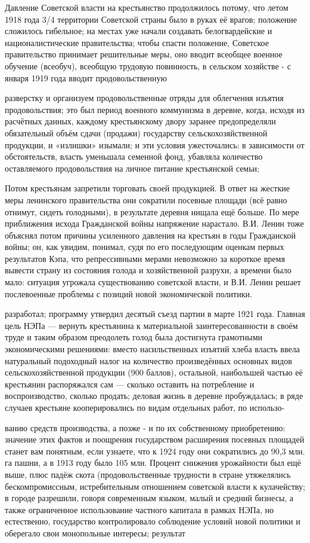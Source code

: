 Давление Советской власти на крестьянство продолжилось потому, что летом 1918 года 3/4 территории Советской страны было в руках её врагов; положение сложилось гибельное; на местах уже начали создавать белогвардейские и националистические правительства; чтобы спасти положение, Советское правительство принимает решительные меры, оно вводит всеобщее военное обучение (всеобуч), всеобщую трудовую повинность, в сельском хозяйстве - с января 1919 года вводит продовольственную

разверстку и организуем продовольственные отряды для облегчения изъятия продовольствия; это был период военного коммунизма в деревне, когда, исходя из расчётных данных, каждому крестьянскому двору заранее предопределяли обязательный объём сдачи (продажи) государству сельскохозяйственной продукции, и «излишки» изымали; и эти условия ужесточались: в зависимости от обстоятельств, власть уменьшала семенной фонд, убавляла количество оставляемого продовольствия на личное питание крестьянской семьи;

Потом крестьянам запретили торговать своей продукцией. В ответ на жесткие меры ленинского правительства они сократили посевные площади (всё равно отнимут, сидеть голодными), в результате деревня нищала ещё больше. По мере приближения исхода Гражданской войны напряжение нарастало. В.И. Ленин тоже объяснял потом причины усиленного давления на крестьян в годы Гражданской войны; он, как увидим, понимал, судя по его последующим оценкам первых результатов Кэпа, что репрессивными мерами невозможно за короткое время вывести страну из состояния голода и хозяйственной разрухи, а времени было мало: ситуация угрожала существованию советской власти, и В.И. Ленин решает послевоенные проблемы с позиций новой экономической политики.

разработал; программу утвердил десятый съезд партии в марте 1921 года. Главная цель НЭПа — вернуть крестьянина к материальной заинтересованности в своём труде и таким образом преодолеть голод была достигнута грамотными экономическими решениями: вместо насильственных изъятий хлеба власть ввела натуральный подоходный налог на количество произведённых основных видов сельскохозяйственной продукции (900 баллов), остальной, наибольшей частью её крестьянин распоряжался сам — сколько оставить на потребление и воспроизводство, сколько продать; деловая жизнь в деревне пробуждалась; в ряде случаев крестьяне кооперировались по видам отдельных работ, по использо-

ванию средств производства, а позже - и по их собственному приобретению: значение этих фактов и поощрения государством расширения посевных площадей станет вам понятным, если узнаете, что к 1924 году они сократились до 90,3 млн. га пашни, а в 1913 году было 105 млн. Процент снижения урожайности был ещё выше, плюс падёж скота (продовольственные трудности в стране утяжелялись бескомпромиссным, истребительным отношением советской власти к кулачейству; в городе разрешили, говоря современным языком, малый и средний бизнесы, а также ограниченное использование частного капитала в рамках НЭПа, но естественно, государство контролировало соблюдение условий новой политики и оберегало свои монопольные интересы; результат


